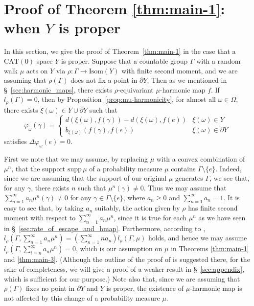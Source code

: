 \documentclass[12pt]{amsart}
\numberwithin{equation}{section}
\theoremstyle{plain}
\theoremstyle{definition}
\theoremstyle{remark}
\newcommand{\isom}[1]{\mathrm{Isom}({#1})}
\newcommand{\cat}[1]{\mathrm{CAT}(#1)}
\newcommand{\supp}{\mathrm{supp}\,}
\begin{document}
\section{Proof of Theorem \ref{thm:main-1}: when $Y$ is proper}
\label{sec:proper_case}

In this section, we give the proof of Theorem~\ref{thm:main-1} in the
case that a $\cat{0}$ space $Y$ is proper. 
Suppose that a countable group $\Gamma$ with a random walk
$\mu$ acts on $Y$ via $\rho \colon \Gamma \rightarrow \isom{Y}$ 
with finite second moment, 
and we are assuming that $\rho(\Gamma)$ does not fix a point in
$\partial Y$. 
Then as we mentioned in \S~\ref{sec:harmonic_maps}, there exists
$\rho$-equivariant $\mu$-harmonic map $f$.  
If $l_{\rho}(\Gamma)=0$, then by Proposition~\ref{prop:mu-harmonicity}, 
for almost all $\omega \in \Omega$, there exists
$\xi(\omega) \in Y \cup \partial Y$ such that 
\begin{equation*}
\varphi_{\omega}(\gamma) =
\begin{cases}
d(\xi(\omega), f(\gamma))-d(\xi(\omega), f(e)) & \xi(\omega) \in
Y \\
b_{\xi(\omega)}(f(\gamma), f(e)) & \xi(\omega) \in \partial Y 
\end{cases}
\end{equation*}
satisfies $\Delta \varphi_{\omega}(e)=0$. 

%
%
First we note that we may assume, by replacing $\mu$ with a convex
combination of $\mu^n$, that the support $\supp\mu$ of
a probability measure $\mu$ contains $\Gamma \setminus \{e\}$. 
Indeed, since we are assuming that the support of our original $\mu$
generates $\Gamma$, we see that, for any $\gamma$, there exists $n$ such
that $\mu^n(\gamma)\not=0$.  
Thus we may assume that $\sum_{n=1}^{\infty }a_n \mu^n(\gamma)\not=0$
for any $\gamma \in \Gamma \setminus \{e\}$, where $a_n\geq 0$ and
$\sum_{n=1}^{\infty}a_n=1$. 
It is easy to see that, by taking $a_n$ suitably,
the action given by $\rho$ has finite second moment with respect to 
$\sum_{n=1}^{\infty}a_n \mu^n$, since it is true for each
$\mu^n$ as we have seen in \S~\ref{sec:rate_of_escape_and_hmap}.
Furthermore, according to \cite[Theorem 4.5]{forghani}, 
$l_{\rho}(\Gamma,\sum_{n=1}^{\infty}a_n\mu^n)=
 \left(\sum_{n=1}^{\infty}n a_n \right) l_{\rho}(\Gamma,\mu)$
holds, and hence we may assume 
$l_{\rho}(\Gamma,\sum_{i=n}^{\infty}a_n\mu^n)=0$, which is our
assumption on $\mu$ in Theorems \ref{thm:main-1} and \ref{thm:main-3}. 
(Although the outline of the proof of \cite[Theorem 4.5]{forghani} is
suggested there, for the sake of completeness, we will give a proof of a
weaker result in \S~\ref{sec:appendix}, which is sufficient for our
purpose.)
Note also that, since we are assuming that $\rho(\Gamma)$
fixes no point in $\partial Y$ and $Y$ is proper, 
the existence of $\mu$-harmonic map is not 
affected by this change of a probability measure $\mu$.
\end{document}
